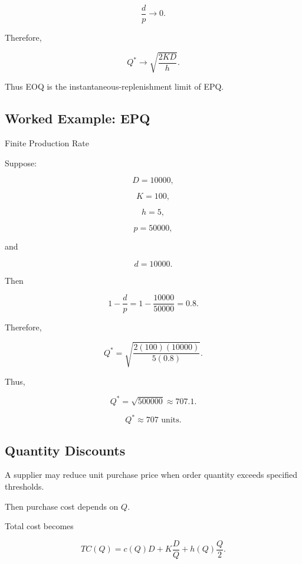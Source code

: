 \[
\frac{d}{p}\to0.
\]

Therefore,

\[
Q^*
\to
\sqrt{
\frac{2KD}{h}
}.
\]

Thus EOQ is the instantaneous-replenishment limit of EPQ.

\subsection{Worked Example: EPQ}
\label{subsec:worked-epq}

\begin{workedexamplebox}{Finite Production Rate}

Suppose:

\[
D=10000,
\]

\[
K=100,
\]

\[
h=5,
\]

\[
p=50000,
\]

and

\[
d=10000.
\]

Then

\[
1-\frac{d}{p}
=
1-\frac{10000}{50000}
=
0.8.
\]

Therefore,

\[
Q^*
=
\sqrt{
\frac{
2(100)(10000)
}{
5(0.8)
}
}.
\]

Thus,

\[
Q^*
=
\sqrt{500000}
\approx707.1.
\]

\begin{answerbox}
\[
\boxed{
Q^*\approx707\text{ units}.
}
\]
\end{answerbox}

\end{workedexamplebox}

\subsection{Quantity Discounts}
\label{subsec:quantity-discounts}

A supplier may reduce unit purchase price when order quantity exceeds
specified thresholds.

Then purchase cost depends on \(Q\).

Total cost becomes

\[
\boxed{
TC(Q)
=
c(Q)D
+
K\frac{D}{Q}
+
h(Q)\frac{Q}{2}.
}
\]

